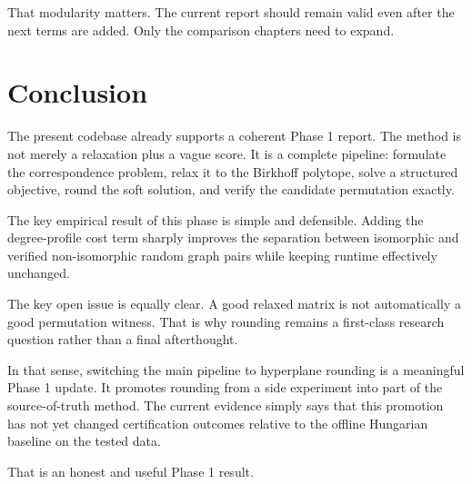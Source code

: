 \documentclass[11pt]{article}
\begin{document}
That modularity matters.
The current report should remain valid even after the next terms are added.
Only the comparison chapters need to expand.

\section{Conclusion}

The present codebase already supports a coherent Phase 1 report.
The method is not merely a relaxation plus a vague score.
It is a complete pipeline:
formulate the correspondence problem,
relax it to the Birkhoff polytope,
solve a structured objective,
round the soft solution,
and verify the candidate permutation exactly.

The key empirical result of this phase is simple and defensible.
Adding the degree-profile cost term sharply improves the separation between isomorphic and verified non-isomorphic random graph pairs while keeping runtime effectively unchanged.

The key open issue is equally clear.
A good relaxed matrix is not automatically a good permutation witness.
That is why rounding remains a first-class research question rather than a final afterthought.

In that sense, switching the main pipeline to hyperplane rounding is a meaningful Phase 1 update.
It promotes rounding from a side experiment into part of the source-of-truth method.
The current evidence simply says that this promotion has not yet changed certification outcomes relative to the offline Hungarian baseline on the tested data.

That is an honest and useful Phase 1 result.
\end{document}
